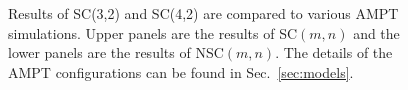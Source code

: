 \begin{figure}[!]
\begin{center}
        \caption{Results of  SC(3,2) and SC(4,2) are compared to various AMPT simulations. Upper panels are the results of SC$(m,n)$ and the lower panels are the results of NSC$(m,n)$. The details of the AMPT configurations can be found in Sec.~\ref{sec:models}.}
        \label{fig:Figure_4}
        \end{center}   
 \end{figure}
 
